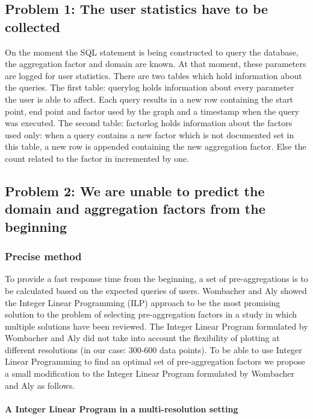 \subsection{Problem 1: The user statistics have to be collected}
On the moment the SQL statement is being constructed to query the database, the aggregation factor and domain are known. At that moment, these parameters are logged for user statistics.
There are two tables which hold information about the queries. The first table: querylog holds information about every parameter the user is able to affect. Each query results in a new row containing the start point, end point and factor used by the graph and a timestamp when the query was executed. The second table: factorlog holds information about the factors used only: when a query contains a new factor which is not documented set in this table, a new row is appended containing the new aggregation factor. Else the count related to the factor in incremented by one.\\

\subsection{Problem 2: We are unable to predict the domain and aggregation factors from the beginning}
\subsubsection{Precise method}
To provide a fast response time from the beginning, a set of pre-aggregations is to be calculated based on the expected queries of users. Wombacher and Aly \cite{wombacher2011} showed the Integer Linear Programming (ILP) approach to be the most promising solution to the problem of selecting pre-aggregation factors in a study in which multiple solutions have been reviewed. The Integer Linear Program formulated by Wombacher and Aly \cite{wombacher2011} did not take into account the flexibility of plotting at different resolutions (in our case: 300-600 data points). To be able to use Integer Linear Programming to find an optimal set of pre-aggregation factors we propose a small modification to the Integer Linear Program formulated by Wombacher and Aly \cite{wombacher2011} as follows.
\paragraph{A Integer Linear Program in a multi-resolution setting}

